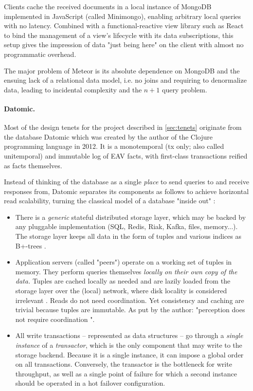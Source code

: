 Clients cache the received documents in a local instance of MongoDB implemented in JavaScript (called Minimongo), enabling arbitrary local queries with no latency. Combined with a functional-reactive view library such as React to bind the management of a view's lifecycle with its data subscriptions, this setup gives the impression of data "just being here" on the client with almost no programmatic overhead.

The major problem of Meteor is its absolute dependence on MongoDB and the ensuing lack of a relational data model, i.e. no joins and requiring to denormalize data, leading to incidental complexity and the $n+1$ query problem.

\paragraph{Datomic.} Most of the design tenets for the project described in \autoref{sec:tenets} originate from the database Datomic \cite{hickey2012dbvalue} which was created by the author of the Clojure programming language in 2012. It is a monotemporal (\gls{tx} only; also called unitemporal) and immutable log of EAV facts, with first-class transactions reified as facts themselves.

Instead of thinking of the database as a single \emph{place} to send queries to and receive responses from, Datomic separates its components as follows to achieve horizontal read scalability, turning the classical model of a database "inside out" \cite{kleppmann2017designing}:
\begin{itemize}
  \item There is a \emph{generic} stateful distributed storage layer, which may be backed by any pluggable implementation (SQL, Redis, Riak, Kafka, files, memory...). The storage layer keeps all data in the form of tuples and various indices as B+-trees \cite{hickey2019datomic}.
  \item Application servers (called "peers") operate on a working set of tuples in memory. They perform queries themselves \emph{locally on their own copy of the data.} Tuples are cached locally as needed and are lazily loaded from the storage layer over the (local) network, where disk locality is considered irrelevant \cite{ananthanarayanan2011disk}. Reads do not need coordination. Yet consistency and caching are trivial because tuples are immutable. As put by the author: "perception does not require coordination \cite{hickey2012values}".
  \item All write transactions -- represented as data structures -- go through a \emph{single instance} of a \emph{transactor}, which is the only component that may write to the storage backend. Because it is a single instance, it can impose a global order on all transactions. Conversely, the transactor is the bottleneck for write throughput, as well as a single point of failure for which a second instance should be operated in a hot failover configuration.
\end{itemize}


